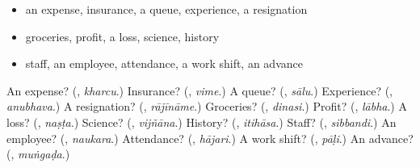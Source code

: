 \begin{itemize}
\raggedright
  \item an expense, insurance, a queue, experience, a resignation
  \item groceries, profit, a loss, science, history
  \item staff, an employee, attendance, a work shift, an advance
\end{itemize}

\begin{tcolorbox}[breakable,colback=teal!4,colframe=teal!35!black,title={Before you move on}]
An expense? (\textbf{}, \emph{kharcu}.) Insurance? (\textbf{}, \emph{vime}.) A queue? (\textbf{}, \emph{sālu}.) Experience? (\textbf{}, \emph{anubhava}.) A resignation? (\textbf{}, \emph{rājīnāme}.) Groceries? (\textbf{}, \emph{dinasi}.) Profit? (\textbf{}, \emph{lābha}.) A loss? (\textbf{}, \emph{naṣṭa}.) Science? (\textbf{}, \emph{vijñāna}.) History? (\textbf{}, \emph{itihāsa}.) Staff? (\textbf{}, \emph{sibbandi}.) An employee? (\textbf{}, \emph{naukara}.) Attendance? (\textbf{}, \emph{hājari}.) A work shift? (\textbf{}, \emph{pāḷi}.) An advance? (\textbf{}, \emph{muṅgaḍa}.)
\end{tcolorbox}
